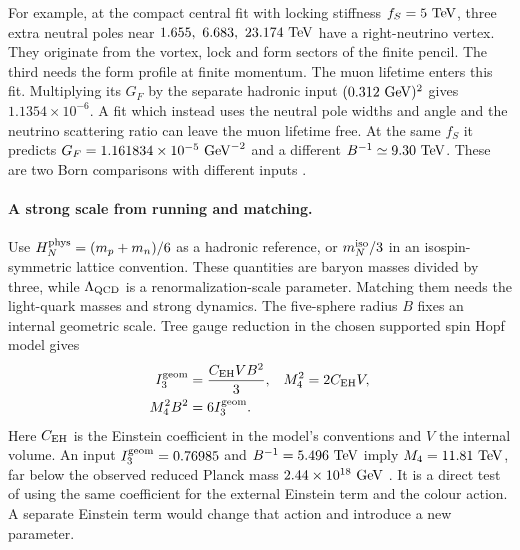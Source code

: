 \documentclass[10pt]{article}
\theoremstyle{definition}
\begin{document}
For example, at the compact central fit with locking stiffness \(f_S=5\ {\rm TeV}\), three extra neutral poles near \(1.655,\ 6.683,\ 23.174\ {\rm TeV}\) have a right-neutrino vertex. They originate from the vortex, lock and form sectors of the finite pencil. The third needs the form profile at finite momentum. The muon lifetime enters this fit. Multiplying its \(G_F\) by the separate hadronic input \((0.312\ {\rm GeV})^2\) gives \(1.1354\times10^{-6}\). A fit which instead uses the neutral pole widths and angle and the neutrino scattering ratio can leave the muon lifetime free. At the same \(f_S\) it predicts \(G_F=1.161834\times10^{-5}\ {\rm GeV}^{-2}\) and a different \(B^{-1}\simeq9.30\ {\rm TeV}\). These are two Born comparisons with different inputs \cite{TwoEndpoint2026,SevenMTheory2026}.

\paragraph{A strong scale from running and matching.} Use \(H_N^{\rm phys}=(m_p+m_n)/6\) as a hadronic reference, or \(m_N^{\rm iso}/3\) in an isospin-symmetric lattice convention. These quantities are baryon masses divided by three, while \(\Lambda_{\rm QCD}\) is a renormalization-scale parameter. Matching them needs the light-quark masses and strong dynamics. The five-sphere radius \(B\) fixes an internal geometric scale. Tree gauge reduction in the chosen supported spin Hopf model gives
\begin{equation}
 \begin{aligned}
 I_3^{\rm geom}&=\frac{C_{\rm EH}VB^2}{3},&
 M_4^2&=2C_{\rm EH}V,\\
 M_4^2B^2&=6I_3^{\rm geom}.
 \end{aligned}
 \label{eq:summer-planck}
\end{equation}
Here \(C_{\rm EH}\) is the Einstein coefficient in the model's conventions and \(V\) the internal volume. An input \(I_3^{\rm geom}=0.76985\) and \(B^{-1}=5.496\ {\rm TeV}\) imply \(M_4=11.81\ {\rm TeV}\), far below the observed reduced Planck mass \(2.44\times10^{18}\ {\rm GeV}\) \cite{CODATA2022Adjustment}. It is a direct test of using the same coefficient for the external Einstein term and the colour action. A separate Einstein term would change that action and introduce a new parameter.
\end{document}
